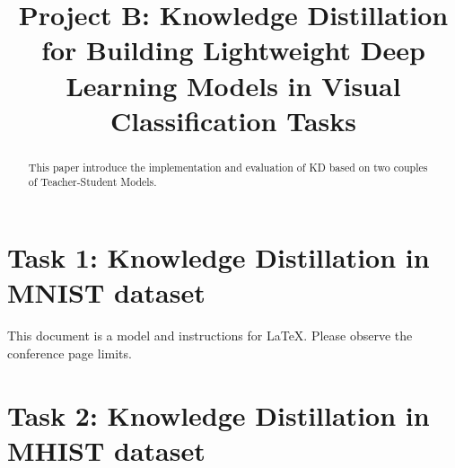 \documentclass[conference]{IEEEtran}
\begin{document}
\title{Project B: Knowledge Distillation for Building Lightweight Deep Learning Models in Visual Classification Tasks
}
\maketitle

\begin{abstract}

This paper introduce the implementation and evaluation of KD based on two couples of Teacher-Student Models.

\end{abstract}

\section{Task 1: Knowledge Distillation in MNIST dataset}
This document is a model and instructions for \LaTeX.
Please observe the conference page limits. 

\section{Task 2: Knowledge Distillation in MHIST dataset}
\end{document}
